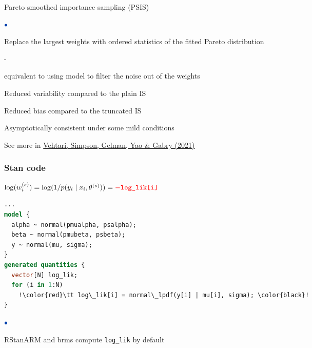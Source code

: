 \documentclass[english,t]{beamer}
\newenvironment{list1}{
   \begin{list}{$\color{list1}\bullet$}{\itemsep=6pt}}{
  \end{list}}
\newenvironment{list2}{
  \begin{list}{-}{\baselineskip=12pt\itemsep=2pt}}{
  \end{list}}
\begin{document}

\begin{frame}{Pareto smoothed importance sampling (PSIS)}

  \vspace{-.5\baselineskip}
  
  \begin{list1}
    \item Replace the largest weights with ordered statistics of the
      fitted Pareto distribution
      \begin{list2}
      \item equivalent to using model to filter the noise out of the weights
      \end{list2}
      \item<2-> Reduced variability compared to the plain IS
      \item<2-> Reduced bias compared to the truncated IS
      \item<3-> Asymptotically consistent under some mild conditions
      \end{list1}
      \vspace{7\baselineskip}

      
      See more in \href{https://arxiv.org/abs/1507.02646}{Vehtari, Simpson, Gelman, Yao \& Gabry (2021)}
\end{frame}

\begin{frame}[fragile]
  \frametitle{Stan code }

  \vspace{\baselineskip}
  $ \log(w_i^{(s)}) = \log(1/p(y_i \mid x_i,\theta^{(s)})) = {\color{red}-\texttt{log\_lik[i]}}$
  \vspace{\baselineskip}

  \pause
  {\small
\begin{lstlisting}[language=Stan,escapechar=!]
...
model {
  alpha ~ normal(pmualpha, psalpha);
  beta ~ normal(pmubeta, psbeta);
  y ~ normal(mu, sigma);
}
generated quantities {
  vector[N] log_lik;
  for (i in 1:N)
    !\color{red}\tt log\_lik[i] = normal\_lpdf(y[i] | mu[i], sigma); \color{black}!
}
\end{lstlisting}
  }

  \begin{list1}
  \item<3-> RStanARM and brms compute {\color{red}\texttt{log\_lik}} by default
  \end{list1}
  
\end{frame}
\end{document}
